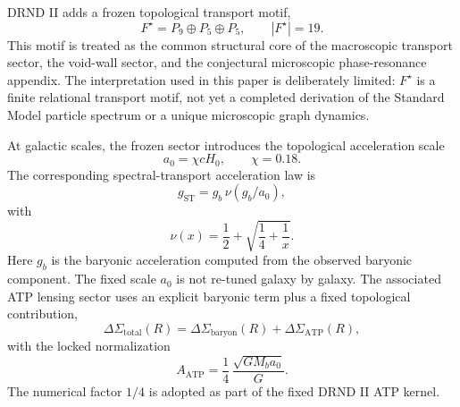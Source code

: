 \documentclass[12pt]{iopart}
\begin{document}
DRND II adds a frozen topological transport motif,
\begin{equation}
F^\star=P_9\oplus P_5\oplus P_5,\qquad |F^\star|=19.
\end{equation}
This motif is treated as the common structural core of the macroscopic transport sector, the void-wall sector, and the conjectural microscopic phase-resonance appendix. The interpretation used in this paper is deliberately limited: $F^\star$ is a finite relational transport motif, not yet a completed derivation of the Standard Model particle spectrum or a unique microscopic graph dynamics.

At galactic scales, the frozen sector introduces the topological acceleration scale
\begin{equation}
a_0=\chi cH_0,\qquad \chi=0.18.
\end{equation}
The corresponding spectral-transport acceleration law is
\begin{equation}
g_{\mathrm{ST}}=g_b\,\nu(g_b/a_0),
\end{equation}
with
\begin{equation}
\nu(x)=\frac12+\sqrt{\frac14+\frac1x}.
\end{equation}
Here $g_b$ is the baryonic acceleration computed from the observed baryonic component. The fixed scale $a_0$ is not re-tuned galaxy by galaxy. The associated ATP lensing sector uses an explicit baryonic term plus a fixed topological contribution,
\begin{equation}
\Delta\Sigma_{\mathrm{total}}(R)
=
\Delta\Sigma_{\mathrm{baryon}}(R)
+
\Delta\Sigma_{\mathrm{ATP}}(R),
\end{equation}
with the locked normalization
\begin{equation}
A_{\mathrm{ATP}}
=
\frac14\,\frac{\sqrt{GM_ba_0}}{G}.
\end{equation}
The numerical factor \(1/4\) is adopted as part of the fixed DRND II ATP kernel.
\end{document}
